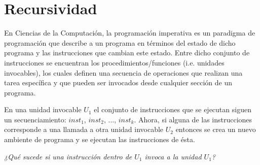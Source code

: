 \newpage
\part{Recursividad}
\setcounter{section}{0}











En Ciencias de la Computación, la programación imperativa es un paradigma de programación que describe a un programa en términos del estado de dicho programa y las instrucciones que cambian este estado. Entre dicho conjunto de instrucciones se encuentran los procedimientos/funciones (i.e. unidades invocables), los cuales definen una secuencia de operaciones que realizan una tarea específica y que pueden ser invocados desde cualquier sección de un programa.

En una unidad invocable $U_1$ el conjunto de instrucciones que se ejecutan siguen un secuenciamiento: $inst_1$, $inst_2$, ..., $inst_k$. Ahora, si alguna de las instrucciones corresponde a una llamada a otra unidad invocable $U_2$ entonces se crea un nuevo ambiente de programa y se ejecutan las instrucciones de ésta.

\begin{center}
	\textit{¿Qué sucede si una instrucción dentro de $U_1$ invoca a la unidad $U_1$?}
\end{center}

